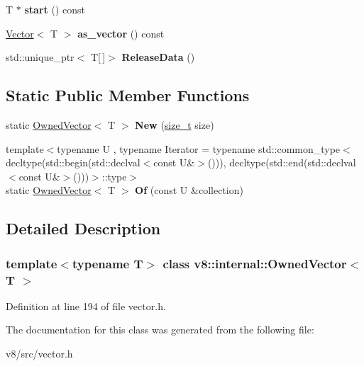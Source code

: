\begin{DoxyCompactItemize}
\item 
\mbox{\label{classv8_1_1internal_1_1OwnedVector_a695e9e40600af95b3ee032f7ff1ff100}} 
T $\ast$ {\bfseries start} () const
\item 
\mbox{\label{classv8_1_1internal_1_1OwnedVector_a78b1c6aa8f3de066524eba3d5e3dd608}} 
\mbox{\hyperlink{classv8_1_1internal_1_1Vector}{Vector}}$<$ T $>$ {\bfseries as\+\_\+vector} () const
\item 
\mbox{\label{classv8_1_1internal_1_1OwnedVector_a1f138b47a593237048d8378ada217b92}} 
std\+::unique\+\_\+ptr$<$ T\mbox{[}$\,$\mbox{]}$>$ {\bfseries Release\+Data} ()
\end{DoxyCompactItemize}
\subsection*{Static Public Member Functions}
\begin{DoxyCompactItemize}
\item 
\mbox{\label{classv8_1_1internal_1_1OwnedVector_a5dd10a8131d90b801f181ca50ed4ec2f}} 
static \mbox{\hyperlink{classv8_1_1internal_1_1OwnedVector}{Owned\+Vector}}$<$ T $>$ {\bfseries New} (\mbox{\hyperlink{classsize__t}{size\+\_\+t}} size)
\item 
\mbox{\label{classv8_1_1internal_1_1OwnedVector_a5e9b6bc519334b47e8f63dfadac8cfa5}} 
{\footnotesize template$<$typename U , typename Iterator  = typename std\+::common\+\_\+type$<$                            decltype(std\+::begin(std\+::declval$<$const U\&$>$())),                            decltype(std\+::end(std\+::declval$<$const U\&$>$()))$>$\+::type$>$ }\\static \mbox{\hyperlink{classv8_1_1internal_1_1OwnedVector}{Owned\+Vector}}$<$ T $>$ {\bfseries Of} (const U \&collection)
\end{DoxyCompactItemize}


\subsection{Detailed Description}
\subsubsection*{template$<$typename T$>$\newline
class v8\+::internal\+::\+Owned\+Vector$<$ T $>$}



Definition at line 194 of file vector.\+h.



The documentation for this class was generated from the following file\+:\begin{DoxyCompactItemize}
\item 
v8/src/vector.\+h\end{DoxyCompactItemize}
